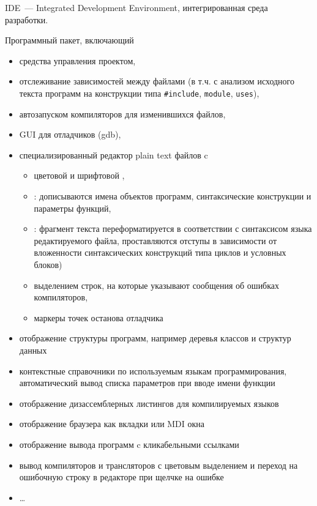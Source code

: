 \secdown

IDE\ --- Integrated Development Environment, интегрированная среда разработки.

Программный пакет, включающий
\begin{itemize}
  \item средства управления проектом,
  \item отслеживание зависимостей между файлами (в т.ч. с анализом исходного
  текста программ на конструкции типа \verb|#include|, \verb|module|,
  \verb|uses|),
  \item автозапуском компиляторов для изменившихся файлов,
  \item GUI для отладчиков (gdb),
  \item специализированный редактор plain text
  файлов c
  \begin{itemize}
    \item цветовой и шрифтовой ,
  	\item {}: дописываются имена объектов программ,
  	синтаксические конструкции и параметры функций,
 \item {}: фрагмент текста переформатируется в
 соответствии с синтаксисом языка редактируемого файла, проставляются отступы в
 зависимости от вложенности синтаксических конструкций типа циклов и условных
 блоков)
  	\item выделением строк, на которые указывают сообщения об ошибках
  	компиляторов,
  	\item маркеры точек останова отладчика
  \end{itemize}
  \item отображение структуры программ, например деревья классов и структур
  данных
  \item контекстные справочники по используемым языкам программирования,
  автоматический вывод списка параметров при вводе имени функции
  \item отображение дизассемблерных листингов для компилируемых языков
  \item отображение браузера как вкладки или MDI окна
  \item отображение вывода  программ c
  кликабельными ссылками
  \item вывод компиляторов и трансляторов с цветовым выделением и переход на
  ошибочную строку в редакторе при щелчке на ошибке
  \item \ldots
\end{itemize}

